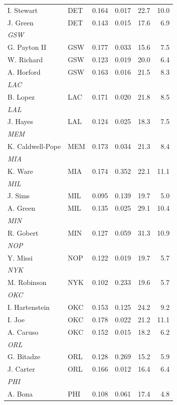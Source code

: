 \documentclass[11pt]{article}
\begin{document}
\begin{longtable}{llrrrr}
I. Stewart & DET & 0.164 & 0.017 & 22.7 & 10.0 \\
J. Green & DET & 0.143 & 0.015 & 17.6 & 6.9 \\
\multicolumn{6}{l}{\textit{GSW}} \\
G. Payton II & GSW & 0.177 & 0.033 & 15.6 & 7.5 \\
W. Richard & GSW & 0.123 & 0.019 & 20.0 & 6.4 \\
A. Horford & GSW & 0.163 & 0.016 & 21.5 & 8.3 \\
\multicolumn{6}{l}{\textit{LAC}} \\
B. Lopez & LAC & 0.171 & 0.020 & 21.8 & 8.5 \\
\multicolumn{6}{l}{\textit{LAL}} \\
J. Hayes & LAL & 0.124 & 0.025 & 18.3 & 7.5 \\
\multicolumn{6}{l}{\textit{MEM}} \\
K. Caldwell-Pope & MEM & 0.173 & 0.034 & 21.3 & 8.4 \\
\multicolumn{6}{l}{\textit{MIA}} \\
K. Ware & MIA & 0.174 & 0.352 & 22.1 & 11.1 \\
\multicolumn{6}{l}{\textit{MIL}} \\
J. Sims & MIL & 0.095 & 0.139 & 19.7 & 5.0 \\
A. Green & MIL & 0.135 & 0.025 & 29.1 & 10.4 \\
\multicolumn{6}{l}{\textit{MIN}} \\
R. Gobert & MIN & 0.127 & 0.059 & 31.3 & 10.9 \\
\multicolumn{6}{l}{\textit{NOP}} \\
Y. Missi & NOP & 0.122 & 0.019 & 19.7 & 5.7 \\
\multicolumn{6}{l}{\textit{NYK}} \\
M. Robinson & NYK & 0.102 & 0.233 & 19.6 & 5.7 \\
\multicolumn{6}{l}{\textit{OKC}} \\
I. Hartenstein & OKC & 0.153 & 0.125 & 24.2 & 9.2 \\
I. Joe & OKC & 0.178 & 0.022 & 21.2 & 11.1 \\
A. Caruso & OKC & 0.152 & 0.015 & 18.2 & 6.2 \\
\multicolumn{6}{l}{\textit{ORL}} \\
G. Bitadze & ORL & 0.128 & 0.269 & 15.2 & 5.9 \\
J. Carter & ORL & 0.166 & 0.012 & 16.4 & 6.4 \\
\multicolumn{6}{l}{\textit{PHI}} \\
A. Bona & PHI & 0.108 & 0.061 & 17.4 & 4.8 \\

\end{longtable}
\end{document}

